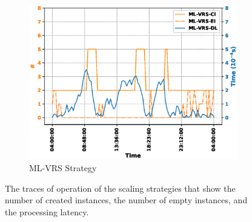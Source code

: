 \documentclass[conference, final]{IEEEtran}
\begin{document}
{\begin{figure}
\begin{subfigure}[h]{0.32\linewidth}
\includegraphics[width=\linewidth]{./figures/ML-VRSinstance_trace.eps}
\caption{{\textsf{ML-VRS}} Strategy}
\end{subfigure}
\caption{The traces of operation of the scaling strategies that show the number of created instances, the number of empty instances, and the processing latency.}
\label{fig:instance_trace}
\end{figure}


}
\end{document}
